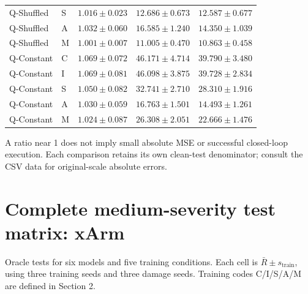\documentclass[11pt,a4paper]{article}
\newcommand{\note}[1]{\begin{tcolorbox}[colback=panel,colframe=rule,boxrule=0.5pt,arc=1mm]#1\end{tcolorbox}}
\begin{document}
\begin{center}
\begin{tabular}{llrrr}
Q-Shuffled & S & $1.016\pm0.023$ & $12.686\pm0.673$ & $12.587\pm0.677$ \\
Q-Shuffled & A & $1.032\pm0.060$ & $16.585\pm1.240$ & $14.350\pm1.039$ \\
Q-Shuffled & M & $1.001\pm0.007$ & $11.005\pm0.470$ & $10.863\pm0.458$ \\
Q-Constant & C & $1.069\pm0.072$ & $46.171\pm4.714$ & $39.790\pm3.480$ \\
Q-Constant & I & $1.069\pm0.081$ & $46.098\pm3.875$ & $39.728\pm2.834$ \\
Q-Constant & S & $1.050\pm0.082$ & $32.741\pm2.710$ & $28.310\pm1.916$ \\
Q-Constant & A & $1.030\pm0.059$ & $16.763\pm1.501$ & $14.493\pm1.261$ \\
Q-Constant & M & $1.024\pm0.087$ & $26.308\pm2.051$ & $22.666\pm1.476$ \\
\bottomrule
\end{tabular}
\end{center}
\note{A ratio near 1 does not imply small absolute MSE or successful closed-loop execution. Each comparison retains its own clean-test denominator; consult the CSV data for original-scale absolute errors.}
\clearpage\section{Complete medium-severity test matrix: xArm}
Oracle tests for six models and five training conditions. Each cell is $\bar R\pm s_{\mathrm{train}}$, using three training seeds and three damage seeds. Training codes C/I/S/A/M are defined in Section 2.
\end{document}
